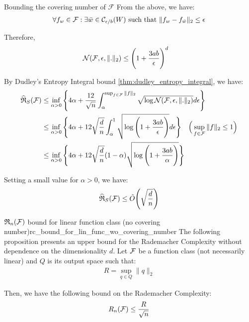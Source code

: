 \begin{proof*}
\begin{subproof}{Bounding the covering number of $\mathcal{F}$}
        \noindent From the above, we have:
        \begin{align*}
            \forall f_w \in \mathcal{F} : \exists \bar{w} \in \mathcal{C}_{\epsilon/b}(W) \text{ such that } \|f_w - f_{\bar{w}}\|_2 \le \epsilon
        \end{align*}

        \noindent Therefore,
        \begin{align*} 
            \mathcal{N}(\mathcal{F}, \epsilon, \|.\|_2) &\le \Bigg( 1+\frac{3ab}{\epsilon} \Bigg)^d 
        \end{align*}
    \end{subproof}

    \noindent By Dudley's Entropy Integral bound \ref{thm:dudley_entropy_integral}, we have:
    \begin{align*}
        \ERC_S(\F) &\le \inf_{\alpha>0}\biggCurl{4\alpha + \frac{12}{\sqrt{n}}\int_\alpha^{\sup_{f\in\F}\|f\|_2} \sqrt{\log\mathcal{N}(\F, \epsilon, \|.\|_2)}d\epsilon} \\
        &\le \inf_{\alpha>0}\biggCurl{4\alpha + 12\sqrt{\frac{d}{n}}\int_\alpha^1 \sqrt{\log\biggRound{1+\frac{3ab}{\epsilon}}}d\epsilon} \ \ \ \bigRound{\sup_{f\in\F}\|f\|_2\le 1} \\
        &\le \inf_{\alpha>0}\biggCurl{
            4\alpha + 12\sqrt{\frac{d}{n}}(1-\alpha)\sqrt{\log\biggRound{
                1+\frac{3ab}{\alpha}
            }
        }}
    \end{align*}

    \noindent Setting a small value for $\alpha>0$, we have:
    \begin{align*}
        \widehat{\mathfrak{R}}_S(\mathcal{F}) \le \tilde O\Bigg( \sqrt{\frac{d}{n}} \Bigg)
    \end{align*}
\end{proof*}


\begin{proposition}{$\mathfrak{R}_n(\mathcal{F})$ bound for linear function class (no covering number)}{rc_bound_for_lin_func_wo_covering_number}
    The following proposition presents an upper bound for the Rademacher Complexity without dependence on the dimensionality $d$. Let $\mathcal{F}$ be a function class (not necessarily linear) and $Q$ is its output space such that:
    \begin{align*}
        R = \sup_{q\in Q} \|q\|_2
    \end{align*}

    \noindent Then, we have the following bound on the Rademacher Complexity:
    \begin{align*}
        R_n(\mathcal{F}) \le \frac{R}{\sqrt n}
    \end{align*}
\end{proposition}

